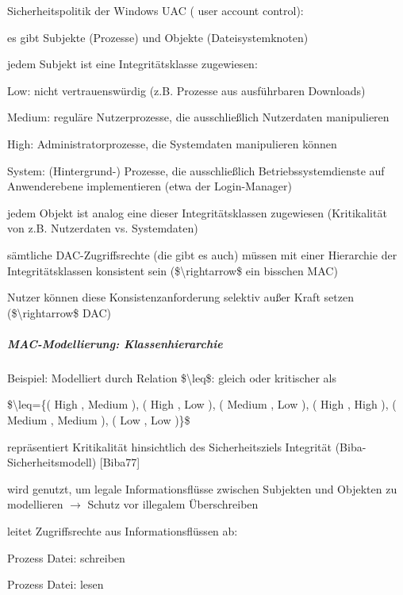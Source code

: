 \documentclass[a4paper]{article}
\begin{document}
\begin{multicols}{3}
    Sicherheitspolitik der Windows UAC ( user account control):

    \begin{itemize*}
        \item
        es gibt Subjekte (Prozesse) und Objekte (Dateisystemknoten)
        \item
        jedem Subjekt ist eine Integritätsklasse zugewiesen:
        \begin{itemize*}
            \item Low: nicht vertrauenswürdig (z.B. Prozesse aus ausführbaren Downloads)
            \item Medium: reguläre Nutzerprozesse, die ausschließlich Nutzerdaten manipulieren
            \item High: Administratorprozesse, die Systemdaten manipulieren können
            \item System: (Hintergrund-) Prozesse, die ausschließlich Betriebssystemdienste auf Anwenderebene implementieren (etwa der Login-Manager)
        \end{itemize*}
        \item
        jedem Objekt ist analog eine dieser Integritätsklassen zugewiesen
        (Kritikalität von z.B. Nutzerdaten vs. Systemdaten)
        \item
        sämtliche DAC-Zugriffsrechte (die gibt es auch) müssen mit einer
        Hierarchie der Integritätsklassen konsistent sein
        (\$\textbackslash rightarrow\$ ein bisschen MAC)
        \item
        Nutzer können diese Konsistenzanforderung selektiv außer Kraft setzen
        (\$\textbackslash rightarrow\$ DAC)
    \end{itemize*}


    \subparagraph{MAC-Modellierung:
        Klassenhierarchie}

    Beispiel: Modelliert durch Relation \$\textbackslash leq\$: gleich oder
    kritischer als

    \$\textbackslash leq=\{( High , Medium ), ( High , Low ), ( Medium , Low
    ), ( High , High ), ( Medium , Medium ), ( Low , Low )\}\$

    \begin{itemize*}
        \item
        repräsentiert Kritikalität hinsichtlich des Sicherheitsziels
        Integrität (Biba-Sicherheitsmodell) {[}Biba77{]}
        \item
        wird genutzt, um legale Informationsflüsse zwischen Subjekten und
        Objekten zu modellieren $\rightarrow$  Schutz vor
        illegalem Überschreiben
        \item
        leitet Zugriffsrechte aus Informationsflüssen ab:
        \begin{itemize*}
            \item Prozess Datei: schreiben
            \item Prozess Datei: lesen
        \end{itemize*}
    \end{itemize*}



\end{multicols}
\end{document}
